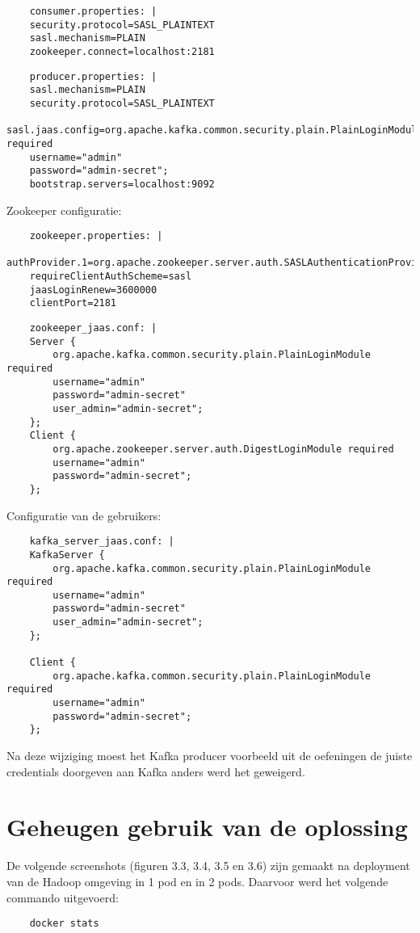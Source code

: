 \begin{lstlisting}
    consumer.properties: |
    security.protocol=SASL_PLAINTEXT
    sasl.mechanism=PLAIN
    zookeeper.connect=localhost:2181
\end{lstlisting}

\begin{lstlisting}
    producer.properties: |
    sasl.mechanism=PLAIN
    security.protocol=SASL_PLAINTEXT
    sasl.jaas.config=org.apache.kafka.common.security.plain.PlainLoginModule required
    username="admin"
    password="admin-secret";
    bootstrap.servers=localhost:9092
\end{lstlisting}

Zookeeper configuratie:
\begin{lstlisting}
    zookeeper.properties: |
    authProvider.1=org.apache.zookeeper.server.auth.SASLAuthenticationProvider
    requireClientAuthScheme=sasl
    jaasLoginRenew=3600000
    clientPort=2181
\end{lstlisting}

\begin{lstlisting}
    zookeeper_jaas.conf: |
    Server {
        org.apache.kafka.common.security.plain.PlainLoginModule required
        username="admin"
        password="admin-secret"
        user_admin="admin-secret";
    };
    Client {
        org.apache.zookeeper.server.auth.DigestLoginModule required
        username="admin"
        password="admin-secret";
    };
\end{lstlisting}

Configuratie van de gebruikers:
\begin{lstlisting}
    kafka_server_jaas.conf: |
    KafkaServer {
        org.apache.kafka.common.security.plain.PlainLoginModule required
        username="admin"
        password="admin-secret"
        user_admin="admin-secret";
    };
    
    Client {
        org.apache.kafka.common.security.plain.PlainLoginModule required
        username="admin"
        password="admin-secret";
    };
\end{lstlisting}

Na deze wijziging moest het Kafka producer voorbeeld uit de oefeningen de juiste credentials doorgeven aan Kafka anders werd het geweigerd.

\section{Geheugen gebruik van de oplossing}
De volgende screenshots (figuren 3.3, 3.4, 3.5 en 3.6) zijn gemaakt na deployment van de Hadoop omgeving in 1 pod en in 2 pods. Daarvoor werd het volgende commando uitgevoerd:
\begin{lstlisting}
    docker stats
\end{lstlisting}


